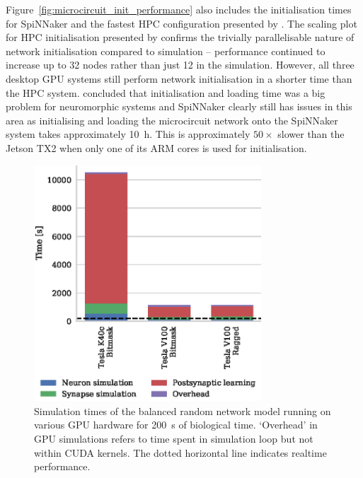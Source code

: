 \documentclass[utf8]{frontiersSCNS} %
\begin{document}
Figure~\ref{fig:microcircuit_init_performance} also includes the initialisation times for SpiNNaker and the fastest HPC configuration presented by \citet{VanAlbada2018}.
The scaling plot for HPC initialisation presented by \citeauthor{VanAlbada2018} confirms the trivially parallelisable nature of network initialisation compared to simulation -- performance continued to increase up to 32 nodes rather than just 12 in the simulation.
However, all three desktop GPU systems still perform network initialisation in a shorter time than the HPC system.
\citet{Diamond2018} concluded that initialisation and loading time was a big problem for neuromorphic systems and SpiNNaker clearly still has issues in this area as initialising and loading the microcircuit network onto the SpiNNaker system takes approximately \SI{10}{\hour}.
This is approximately $50\times$ slower than the Jetson TX2 when only one of its ARM cores is used for initialisation.

\begin{figure}
    \begin{center}
        \includegraphics[width=85mm]{figures/stdp_performance}
    \end{center}
    \caption{Simulation times of the balanced random network model running on various GPU hardware for \SI{200}{\second} of biological time.
    `Overhead' in GPU simulations refers to time spent in simulation loop but not within CUDA kernels.
    The dotted horizontal line indicates realtime performance.}
    \label{fig:stdp_performance}
\end{figure}
\end{document}
